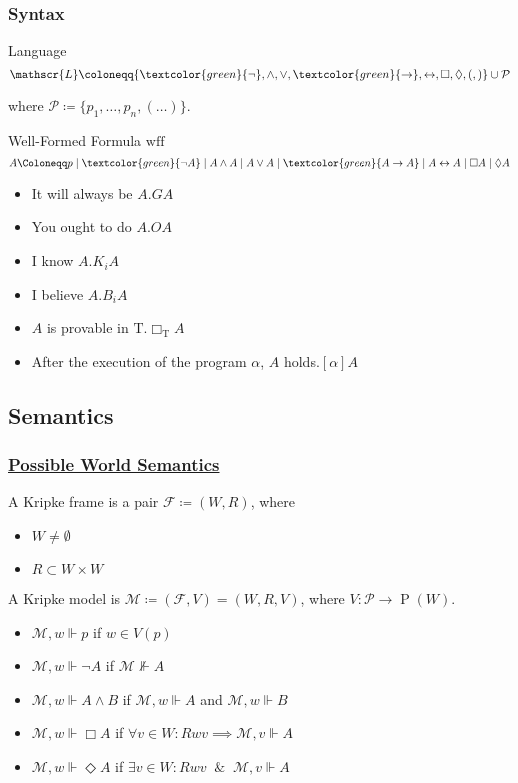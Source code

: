 \documentclass[UTF8,aspectratio=43,11pt,colorlinks,compress,openany]{beamer}%
\begin{document}
\begin{frame}\frametitle{Syntax}
\setlength\abovedisplayskip{0pt}
\setlength\belowdisplayskip{0pt}
	\begin{block}{Language}
		\[\mathscr{L}\coloneqq \{\textcolor{green}{\neg},\wedge,\vee,\textcolor{green}{\to},\leftrightarrow,\Box,\Diamond,(,)\}\cup\mathcal{P}\]
	\end{block}
	where $\mathcal{P}\coloneqq \{p_1,\dots,p_n,(\dots)\}$.
	\begin{block}{Well-Formed Formula $\mathrm{wff}$}
		\[A\Coloneqq p\mid \textcolor{green}{\neg A}\mid A\wedge A\mid A\vee A\mid \textcolor{green}{A\to A}\mid A\leftrightarrow A\mid \Box A\mid \Diamond A\]
	\end{block}
	\begin{itemize}
		\item It will always be $A$.\hfill $GA$
		\item You ought to do $A$.\hfill $O A$
		\item I know $A$.\hfill $K_i A$
		\item I believe $A$.\hfill $B_i A$
		\item $A$ is provable in $\mathrm{T}$.\hfill $\Box_{\mathrm{T}}A$
		\item After the execution of the program $\alpha$, $A$ holds.\hfill $[\alpha]A$
	\end{itemize}
\end{frame}

\subsection{Semantics}

\begin{frame}\frametitle{\href{http://rkirsling.github.io/modallogic/}{Possible World Semantics}}
	A Kripke frame is a pair $\mathcal{F}\coloneqq (W,R)$, where
	\begin{itemize}
		\item $W\neq\emptyset$
		\item $R\subset W\times W$
	\end{itemize}
	A Kripke model is $\mathcal{M}\coloneqq (\mathcal{F},V)=(W,R,V)$, where $V:\mathcal{P}\to \operatorname{P}(W)$.
	\begin{itemize}
		\item $\mathcal{M},w\Vdash p$ if $w\in V(p)$
		\item $\mathcal{M},w\Vdash\neg A$ if $\mathcal{M}\nVdash A$
		\item $\mathcal{M},w\Vdash A\wedge B$ if $\mathcal{M},w\Vdash A$ and $\mathcal{M},w\Vdash B$
		\item $\mathcal{M},w\Vdash\Box A$ if $\forall v\in W: Rwv\implies\mathcal{M},v\Vdash A$
		\item $\mathcal{M},w\Vdash\Diamond A$ if $\exists v\in W: Rwv\;\;\&\;\;\mathcal{M},v\Vdash A$
	\end{itemize}
\end{frame}
\end{document}
